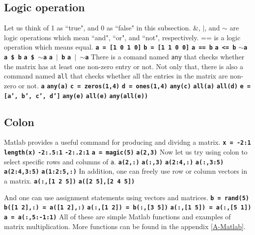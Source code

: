 \subsection{Logic operation}
Let us think of 1 as ``true", and 0 as ``false" in this subsection. \&, $|$, and $\sim$ are logic operations which mean ``and", ``or", and ``not", respectively. == is a logic operation which means equal.  \matlabp\texttt{\textbf{a = [1 0 1 0]}}  \matlabp\texttt{\textbf{b = [1 1 0 0]}}  \matlabp\texttt{\textbf{a == b}}  \matlabp\texttt{\textbf{a <= b}}  \matlabp\texttt{\textbf{$\sim$a}}  \matlabp\texttt{\textbf{a \$ b}}  \matlabp\texttt{\textbf{a \$ $\sim$a}}  \matlabp\texttt{\textbf{a $|$ b}}  \matlabp\texttt{\textbf{a $|$ $\sim$a}} \vn There is a comand named {\tt any} that checks whether the matrix has at least one non-zero entry or not. Not only that, there is also a command named {\tt all} that checks whether all the entries in the matrix are non-zero or not.  \matlabp\texttt{\textbf{a}}  \matlabp\texttt{\textbf{any(a)}}  \matlabp\texttt{\textbf{c = zeros(1,4)}}  \matlabp\texttt{\textbf{d = ones(1,4)}}  \matlabp\texttt{\textbf{any(c)}}  \matlabp\texttt{\textbf{all(a)}}  \matlabp\texttt{\textbf{all(d)}}  \matlabp\texttt{\textbf{e = [a', b', c', d']}}  \matlabp\texttt{\textbf{any(e)}}  \matlabp\texttt{\textbf{all(e)}}  \matlabp\texttt{\textbf{any(all(e))}}

\subsection{Colon}
Matlab provides a useful command for producing and dividng a matrix.  \matlabp\texttt{\textbf{x = -2:1}}  \matlabp\texttt{\textbf{length(x)}}  \matlabp\texttt{\textbf{-2:.5:1}}  \matlabp\texttt{\textbf{-2:.2:1}}  \matlabp\texttt{\textbf{a = magic(5)}}  \matlabp\texttt{\textbf{a(2,3)}} \vn Now let us try using colon to select specific rows and columns of {\tt a}.  \matlabp\texttt{\textbf{a(2,:)}} \matlabp\texttt{\textbf{a(:,3)}} \matlabp\texttt{\textbf{a(2:4,:)}} \matlabp\texttt{\textbf{a(:,3:5)}} \matlabp\texttt{\textbf{a(2:4,3:5)}} \matlabp\texttt{\textbf{a(1:2:5,:)}} \vn In addition, one can freely use row or column vectors in a matrix. \matlabp\texttt{\textbf{a(:,[1 2 5])}} \matlabp\texttt{\textbf{a([2 5],[2 4 5])}}

\vn And one can use assignment statements using vectors and matrices. \matlabp\texttt{\textbf{b = rand(5)}} \matlabp\texttt{\textbf{b([1 2],:) = a([1 2],:)}} \matlabp\texttt{\textbf{a(:,[1 2]) = b(:,[3 5])}} \matlabp\texttt{\textbf{a(:,[1 5]) = a(:,[5 1])}} \matlabp\texttt{\textbf{a = a(:,5:-1:1)}} \vn All of these are simple Matlab functions and examples of matrix multiplication. More functions can be found in the appendix \ref{A-Matlab}.

